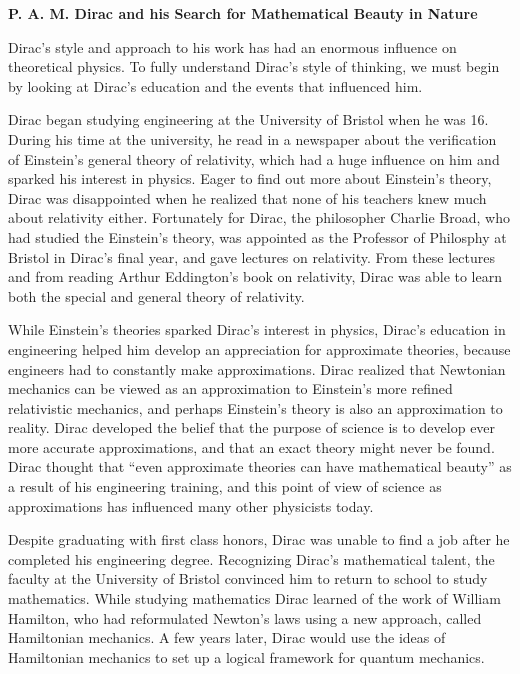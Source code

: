 \documentclass[12pt, oneside, letterpaper, fleqn]{article}
\begin{document}
\begin{center}
\textbf{P. A. M. Dirac and his Search for Mathematical Beauty in Nature}
\end{center}

Dirac's style and approach to his work has had an enormous influence
on theoretical physics. To fully understand Dirac's style of thinking,
we must begin by looking at Dirac's education and the events that
influenced him.

Dirac began studying engineering at the University of Bristol when he
was 16. During his time at the university, he read in a newspaper about
the verification of Einstein's general theory of relativity, which had a
huge influence on him and sparked his interest in physics. Eager to find
out more about Einstein's theory, Dirac was disappointed when he
realized that none of his teachers knew much about relativity either.
Fortunately for Dirac, the philosopher Charlie Broad, who had studied
the Einstein's theory, was appointed as the Professor of Philosphy at
Bristol in Dirac's final year, and gave lectures on relativity. From
these lectures and from reading Arthur Eddington's book on relativity,
Dirac was able to learn both the special and general theory of
relativity.

While Einstein's theories sparked Dirac's interest in physics, Dirac's
education in engineering helped him develop an appreciation for
approximate theories, because engineers had to constantly make
approximations. Dirac realized that Newtonian mechanics can be viewed as
an approximation to Einstein's more refined relativistic mechanics, and
perhaps Einstein's theory is also an approximation to reality. Dirac
developed the belief that the purpose of science is to develop ever more
accurate approximations, and that an exact theory might never be found.
Dirac thought that ``even approximate theories can have mathematical
beauty'' \cite[pg. 45]{strangest_man} as a result of his engineering
training, and this point of view of science as approximations has
influenced many other physicists today.

Despite graduating with first class honors, Dirac was unable to find a
job after he completed his engineering degree. Recognizing Dirac's
mathematical talent, the faculty at the University of Bristol convinced
him to return to school to study mathematics. While studying mathematics
Dirac learned of the work of William Hamilton, who had reformulated
Newton's laws using a new approach, called Hamiltonian mechanics. A few
years later, Dirac would use the ideas of Hamiltonian mechanics to set up a
logical framework for quantum mechanics.
\end{document}
